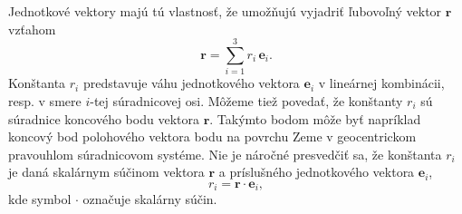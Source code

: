 \documentclass[a4paper, 12pt]{book}
\let\vec\mathbf
\begin{document}
Jednotkové vektory majú tú vlastnosť, že umožňujú vyjadriť ľubovoľný vektor 
$\vec r$ vzťahom
%
\begin{equation}
\label{eq:r_synthesis}
\vec r = \sum_{i = 1}^3 r_i \, \vec e_i{.}
\end{equation}
%
Konštanta $r_i$ predstavuje váhu jednotkového vektora $\vec e_i$ v lineárnej 
kombinácii, resp. v smere $i$-tej súradnicovej osi.  Môžeme tiež povedať, že 
konštanty $r_i$ sú súradnice koncového bodu vektora $\vec r$.  Takýmto bodom 
môže byť napríklad koncový bod polohového vektora bodu na povrchu Zeme 
v geocentrickom pravouhlom súradnicovom systéme.  Nie je náročné presvedčiť sa, 
že konštanta $r_i$ je daná skalárnym súčinom vektora $\vec r$ a príslušného 
jednotkového vektora $\vec e_i$,
%
\begin{equation}
\label{eq:r_analysis}
r_i = \vec r \cdot \vec e_i{,}
\end{equation}
%
kde symbol $\cdot$ označuje skalárny súčin.
\end{document}
